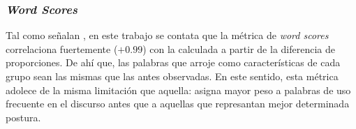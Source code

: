 \subsubsection{\textit{Word Scores}}

Tal como señalan \cite{monroe2008fightin}, en este trabajo se contata que
la m\'etrica de \textit{word scores} correlaciona fuertemente ($+0.99$) con
la calculada a partir de la diferencia de proporciones. De ah\'i que, las palabras
que arroje como caracter\'isticas de cada grupo sean las mismas que las antes
observadas. En este sentido, esta m\'etrica adolece de la misma limitaci\'on
que aquella: asigna mayor peso a palabras de uso frecuente en el discurso antes
que a aquellas que represantan mejor determinada postura.
